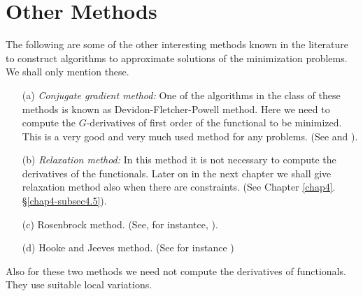 \section{Other Methods}\label{chap3-sec3}
The following are some of the other interesting methods known in the literature to construct algorithms to approximate solutions of the minimization problems. We shall only mention these.

\begin{enumerate}
\item[(a)]{\textit{Conjugate gradient method:}} One of the algorithms in the class of these methods is known as Devidon-Fletcher-Powell method. Here we need to compute the $G$-derivatives of first order of the functional to be minimized. This is a very good and very much used method for any problems. (See \cite{key11} and \cite{key15}).

\item[(b)]{\textit{Relaxation method:}} In this method it is not necessary to compute the derivatives of the functionals. Later on in the next chapter we shall give relaxation method also when there are constraints. (See Chapter \ref{chap4}. \S \ref{chap4-subsec4.5}).

\item[(c)] Rosenbrock method. (See, for instantce, \cite{key30}).

\item[(d)] Hooke and Jeeves method. (See for instance \cite{key30})
\end{enumerate}
Also for these two methods we need not compute the derivatives of functionals. They use suitable local variations.



